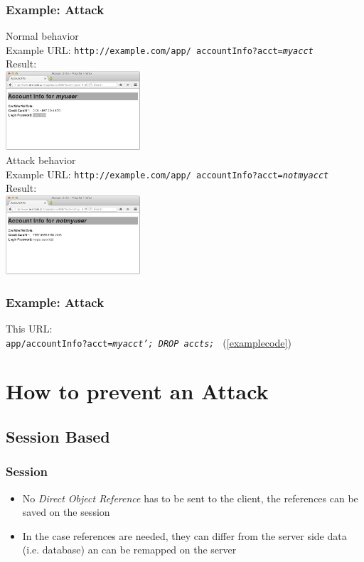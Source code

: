 \documentclass[aspectratio=169]{beamer}
\begin{document}
\begin{frame}
  \frametitle{Example: Attack}
  \begin{multicols}{2}
   \LARGE{Normal behavior}\\\normalsize Example URL: \small\texttt{http://example.com/app/ accountInfo?acct=\textit{myacct}}\\
   \normalsize{Result:}\\\includegraphics[width=5cm]{example_web_s1}\\
   \LARGE{Attack behavior}\\\normalsize Example URL: \small\texttt{http://example.com/app/ accountInfo?acct=\textit{notmyacct}}\\
   \normalsize{Result:}\\\includegraphics[width=5cm]{example_web_s2}\\
  \end{multicols}
\end{frame}

\begin{frame}
  \frametitle{Example: Attack}
  This URL:\\ \texttt{app/accountInfo?acct=\textit{myacct'; DROP accts; }} (\ref{examplecode})
\end{frame}


\section{How to prevent an Attack}

\subsection{Session Based}

\begin{frame}
  \frametitle{Session}
  \begin{itemize}
    \item No \textit{Direct Object Reference} has to be sent to the client, the references can be saved on the session
    \item In the case references are needed, they can differ from the server side data (i.e. database) an can be remapped on the server
  \end{itemize}
\end{frame}
\end{document}
